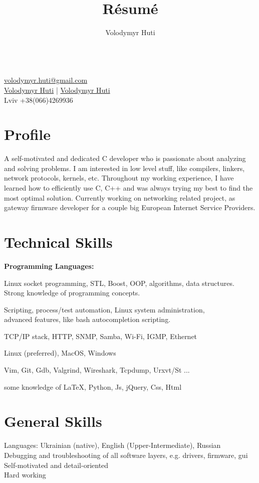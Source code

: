 \documentclass{article}
\author{Volodymyr Huti}
\title{R\'esum\'e}
\date{}
\makeatletter
\renewcommand{\maketitle}{
    \begin{center}
    {\huge\bfseries\theauthor}\\
    \vspace{.25em}
    \href{volodymyr.huti@gmail.com}{\faMailForward{} volodymyr.huti@gmail.com}\\
    \href{https://github.com/volodymyrhuti }{\faGithub{} Volodymyr Huti} |
    \href{https://www.linkedin.com/in/volodymyr-huti-b03a41156/}{\faLinkedinSquare{} Volodymyr Huti}\\
    Lviv +38(066)4269936 \\
    \end{center}
}
\makeatother
\begin{document}
\thispagestyle{empty}       %
\maketitle


\section{Profile}
A self-motivated and dedicated C developer who is passionate about analyzing and solving problems. I am interested in low level stuff, like compilers, linkers, network protocols, kernels, etc. Throughout my working experience, I have learned how to efficiently use C, C++  and was always trying my best to find the most optimal solution. Currently working on networking related project, as gateway firmware developer for a couple big European Internet Service Providers.

\section{Technical Skills}
\textbf{Programming Languages:}
\begin{description}[align=left,leftmargin=3.8cm,style=multiline]
\item[C/C++] Linux socket programming, STL, Boost, OOP, algorithms, data structures.\\
             Strong knowledge of programming concepts.
\item[Shell] Scripting, process/test automation, Linux system administration,\\
             advanced features, like bash autocompletion scripting.\\
\item[Networking:] TCP/IP stack, HTTP, SNMP, Samba, Wi-Fi, IGMP, Ethernet
\item[Operating System:] Linux (preferred), MacOS, Windows
\item[Development Tools:] Vim, Git, Gdb, Valgrind, Wireshark, Tcpdump, Urxvt/St ...
\item[General:] some knowledge of \LaTeX, Python, Js, jQuery, Css, Html
\end{description}

\section{General Skills}
Languages: Ukrainian (native), English (Upper-Intermediate), Russian\\
Debugging and troubleshooting of all software layers, e.g. drivers, firmware, gui\\
Self-motivated and detail-oriented\\
Hard working
\end{document}
